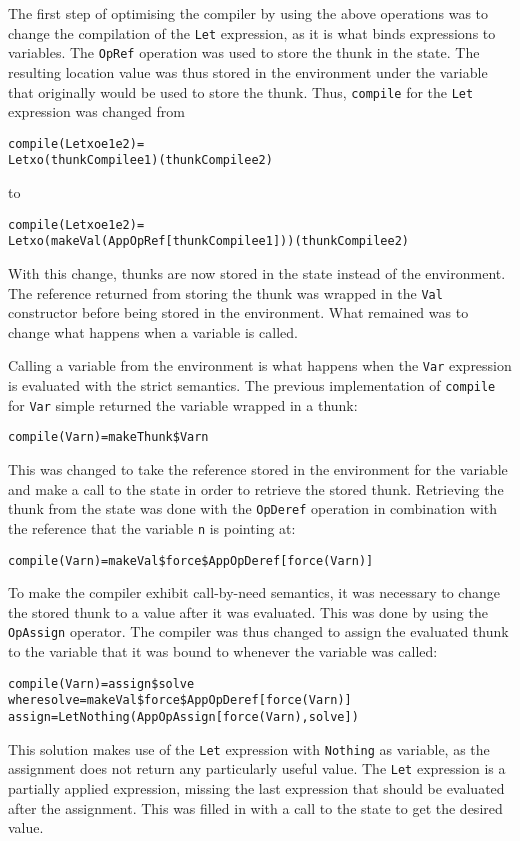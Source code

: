 The first step of optimising the compiler by using the above operations was to
change the compilation of the \texttt{Let} expression, as it is what binds
expressions to variables. The \texttt{OpRef} operation was used to store the
thunk in the state. The resulting location value was thus stored in the
environment under the variable that originally would be used to store the thunk.
Thus, \texttt{compile} for the \texttt{Let} expression was changed from
\begin{alltt}
  compile (Let xo e1 e2) =
    Let xo (thunkCompile e1) (thunkCompile e2)
\end{alltt}
to
\begin{alltt}
  compile (Let xo e1 e2) =
    Let xo (makeVal (App OpRef [thunkCompile e1])) (thunkCompile e2)
\end{alltt}
With this change, thunks are now stored in the state instead of the environment.
The reference returned from storing the thunk was wrapped in the \texttt{Val}
constructor before being stored in the environment.
What remained was to change what happens when a variable is called.

Calling a variable from the environment is what happens when the \texttt{Var}
expression is evaluated with the strict semantics. The previous implementation
of \texttt{compile} for \texttt{Var} simple returned the variable wrapped in a
thunk:
\begin{alltt}
  compile (Var n) = makeThunk \$ Var n
\end{alltt}
This was changed to take the reference stored in the environment for the
variable and make a call to the state in order to retrieve the stored thunk.
Retrieving the thunk from the state was done with the \texttt{OpDeref}
operation in combination with the reference that the variable \texttt{n} is
pointing at:
\begin{alltt}
  compile (Var n) = makeVal \$ force \$ App OpDeref [force (Var n)]
\end{alltt}
To make the compiler exhibit call-by-need semantics, it was necessary to
change the stored thunk to a value after it was evaluated. This was done by
using the \texttt{OpAssign} operator. The compiler was thus changed to assign
the evaluated thunk to the variable that it was bound to whenever the variable
was called:
\begin{alltt}
  compile (Var n) = assign \$ solve
    where solve  = makeVal \$ force \$ App OpDeref [force (Var n)]
          assign = Let Nothing (App OpAssign [force (Var n), solve])
\end{alltt}
\noindent This solution makes use of the \texttt{Let} expression with \texttt{Nothing} as
variable, as the assignment does not return any particularly useful value. The
\texttt{Let} expression is a partially applied expression, missing the last
expression that should be evaluated after the assignment. This was filled in
with a call to the state to get the desired value.


